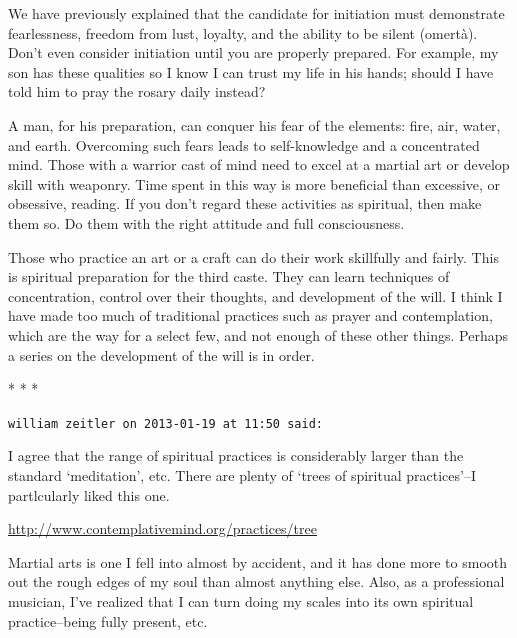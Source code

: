 We have previously explained that the candidate for initiation must demonstrate fearlessness, freedom from lust, loyalty, and the ability to be silent (omertà). Don't even consider initiation until you are properly prepared. For example, my son has these qualities so I know I can trust my life in his hands; should I have told him to pray the rosary daily instead?

A man, for his preparation, can conquer his fear of the elements: fire, air, water, and earth. Overcoming such fears leads to self-knowledge and a concentrated mind. Those with a warrior cast of mind need to excel at a martial art or develop skill with weaponry. Time spent in this way is more beneficial than excessive, or obsessive, reading. If you don't regard these activities as spiritual, then make them so. Do them with the right attitude and full consciousness.

Those who practice an art or a craft can do their work skillfully and fairly. This is spiritual preparation for the third caste. They can learn techniques of concentration, control over their thoughts, and development of the will. I think I have made too much of traditional practices such as prayer and contemplation, which are the way for a select few, and not enough of these other things. Perhaps a series on the development of the will is in order.




\begin{center}* * *\end{center}

\begin{footnotesize}\begin{sffamily}



\texttt{william zeitler on 2013-01-19 at 11:50 said: }

I agree that the range of spiritual practices is considerably larger than the standard `meditation', etc. There are plenty of `trees of spiritual practices'–I partlcularly liked this one.

\url{http://www.contemplativemind.org/practices/tree}

Martial arts is one I fell into almost by accident, and it has done more to smooth out the rough edges of my soul than almost anything else. Also, as a professional musician, I've realized that I can turn doing my scales into its own spiritual practice–being fully present, etc.


\end{sffamily}\end{footnotesize}
